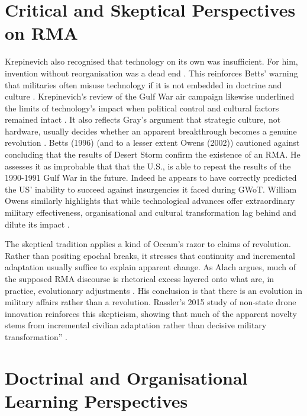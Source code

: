\section{Critical and Skeptical Perspectives on RMA}

Krepinevich also recognised that technology on its own was insufficient. For him, invention without reorganisation was a dead end \parencite{KREPINEVICH_1992}. This reinforces Betts’ warning that militaries often misuse technology if it is not embedded in doctrine and culture \parencite{BETTS_1996}. Krepinevich’s review of the Gulf War air campaign likewise underlined the limits of technology’s impact when political control and cultural factors remained intact \parencite{KREPINEVICH_1996}. It also reflects Gray’s argument that strategic culture, not hardware, usually decides whether an apparent breakthrough becomes a genuine revolution \parencite{GRAY_2005}. Betts (1996) (and to a lesser extent Owens (2002)\nocite{OWENS_2002}) cautioned against concluding that the results of Desert Storm confirm the existence of an RMA. He assesses it as improbable that that the U.S., is able to repeat the results of the 1990-1991 Gulf War in the future. Indeed he appears to have correctly predicted the US' inability to succeed against insurgencies it faced during GWoT. William Owens  similarly highlights that while technological advances offer extraordinary military effectiveness, organisational and cultural transformation lag behind and dilute its impact \parencite{OWENS_2002}. 

The skeptical tradition applies a kind of Occam’s razor to claims of revolution. Rather than positing epochal breaks, it stresses that continuity and incremental adaptation usually suffice to explain apparent change. As Alach argues, much of the supposed RMA discourse is rhetorical excess layered onto what are, in practice, evolutionary adjustments \parencite[.p~50-52]{ALACH_2008}. His conclusion is that there is an evolution in military affairs rather than a revolution. Rassler’s 2015 study of non-state drone innovation reinforces this skepticism, showing that much of the apparent novelty stems from incremental civilian adaptation rather than decisive military transformation”  \parencite{RASSLER_2015}.

\section{Doctrinal and Organisational Learning Perspectives}

